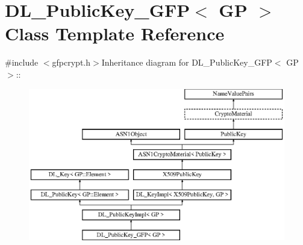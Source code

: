\hypertarget{class_d_l___public_key___g_f_p}{
\section{DL\_\-PublicKey\_\-GFP$<$ GP $>$ Class Template Reference}
\label{class_d_l___public_key___g_f_p}
}


{\ttfamily \#include $<$gfpcrypt.h$>$}Inheritance diagram for DL\_\-PublicKey\_\-GFP$<$ GP $>$::\begin{figure}[H]
\begin{center}
\leavevmode
\includegraphics[height=6.66667cm]{class_d_l___public_key___g_f_p}
\end{center}
\end{figure}
